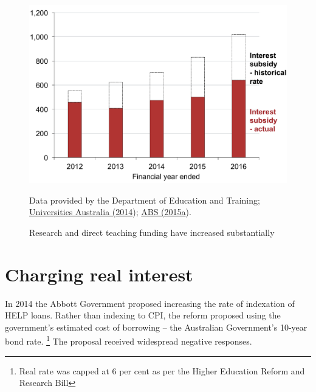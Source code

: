 \documentclass[embargoed]{grattan}
\begin{document}
\begin{figure}
\caption{Research and direct teaching funding have increased substantially\label{fig:fig12-research-direct-teaching-funding-have-increased-substantially}}


\includegraphics[page=12]{atlas/Chartpack.pdf}

{Data provided by the Department of Education and Training; \protect\hyperlink{_ENREF_78}{Universities Australia (2014}); \protect\hyperlink{_ENREF_2}{ABS (2015a}).}
\end{figure}


\chapter{Charging real interest}\label{chap:charging-real-interest}

In 2014 the Abbott Government proposed increasing the rate of indexation of HELP loans.
Rather than indexing to \gls{CPI}, the reform proposed using the government's estimated cost of borrowing -- the Australian Government's 10-year bond rate.%
\footnote{Real rate was capped at 6 per cent as per the Higher Education Reform and Research Bill} The proposal received widespread negative responses.
\end{document}

